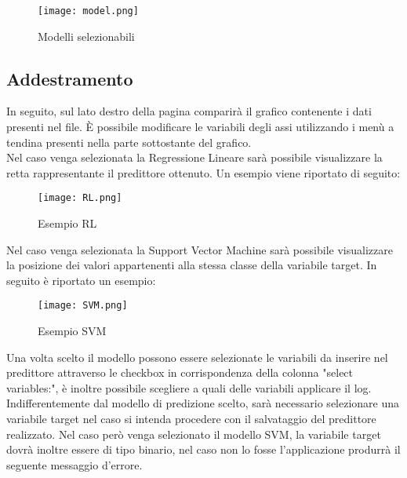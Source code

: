 \documentclass[../manuale-utente.tex]{subfiles}
\begin{document}
\begin{figure}[h!]
  \begin{center}
    \texttt{[image: model.png]}\\
    \caption{Modelli selezionabili}%
    \label{fig:modelli_selezionabili}
  \end{center}
  \end{figure}

\newpage
\subsection{Addestramento}
\label{subs:addestramento}

In seguito, sul lato destro della pagina comparirà il grafico contenente i dati presenti nel file. È possibile modificare le variabili degli assi utilizzando i menù a tendina presenti nella parte sottostante del grafico.\\
Nel caso venga selezionata la Regressione Lineare sarà possibile visualizzare la retta rappresentante il predittore ottenuto. Un esempio viene riportato di seguito:

\begin{figure}[h!]
  \begin{center}
    \texttt{[image: RL.png]}\\
    \caption{Esempio RL}%
    \label{fig:RL}
  \end{center}
  \end{figure}


\newpage
Nel caso venga selezionata la Support Vector Machine sarà possibile visualizzare la posizione dei valori appartenenti alla stessa classe della variabile target. In seguito è riportato un esempio:

  \begin{figure}[h!]
    \begin{center}
      \texttt{[image: SVM.png]}\\
      \caption{Esempio SVM}%
      \label{fig:SVM}
    \end{center}
    \end{figure}

\newpage
Una volta scelto il modello possono essere selezionate le variabili da inserire nel predittore attraverso le checkbox in corrispondenza della colonna "select variables:", è inoltre possibile scegliere a quali delle variabili applicare il log.
Indifferentemente dal modello di predizione scelto, sarà necessario selezionare una variabile target nel caso si intenda procedere con il salvataggio del predittore realizzato.
Nel caso però venga selezionato il modello SVM, la variabile target dovrà inoltre essere di tipo binario, nel caso non lo fosse l'applicazione produrrà il seguente messaggio d'errore.
\end{document}
